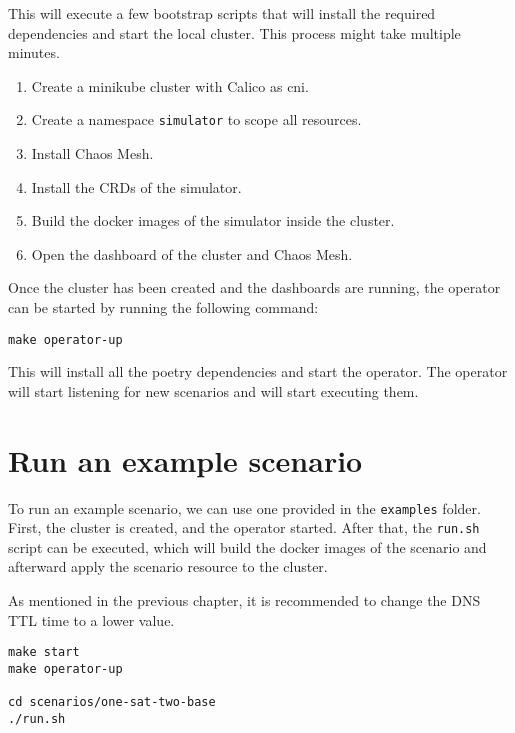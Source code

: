 This will execute a few bootstrap scripts that will install the required dependencies and start the local cluster. This process might take multiple minutes.

\begin{enumerate}
  \item Create a minikube cluster with Calico as \ac{cni}.
  \item Create a namespace \verb|simulator| to scope all resources.
  \item Install Chaos Mesh.
  \item Install the CRDs of the simulator.
  \item Build the docker images of the simulator inside the cluster.
  \item Open the dashboard of the cluster and Chaos Mesh.
\end{enumerate}

Once the cluster has been created and the dashboards are running, the operator can be started by running the following command:

\begin{verbatim}
make operator-up
\end{verbatim}

This will install all the poetry dependencies and start the operator. The operator will start listening for new scenarios and will start executing them.

\section{Run an example scenario}

To run an example scenario, we can use one provided in the \verb|examples| folder. First, the cluster is created, and the operator started. After that, the \verb|run.sh| script can be executed, which will build the docker images of the scenario and afterward apply the scenario resource to the cluster.

As mentioned in the previous chapter, it is recommended to change the DNS TTL time to a lower value.

\begin{verbatim}
make start
make operator-up

cd scenarios/one-sat-two-base
./run.sh
\end{verbatim}
